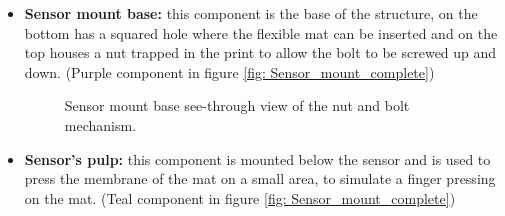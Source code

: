 \begin{itemize}
    \item \textbf{Sensor mount base:} this component is the base of the structure, on the bottom has a squared hole where the flexible mat can be inserted and on the top houses a nut trapped in the print to allow the bolt to be screwed up and down. (Purple component in figure \ref{fig: Sensor_mount_complete})
    \begin{figure}
        \centering
        \caption{Sensor mount base see-through view of the nut and bolt mechanism.}
    \end{figure}

    \item \textbf{Sensor's pulp:} this component is mounted below the sensor and is used to press the membrane of the mat on a small area, to simulate a finger pressing on the mat. (Teal component in figure \ref{fig: Sensor_mount_complete})

\end{itemize}

